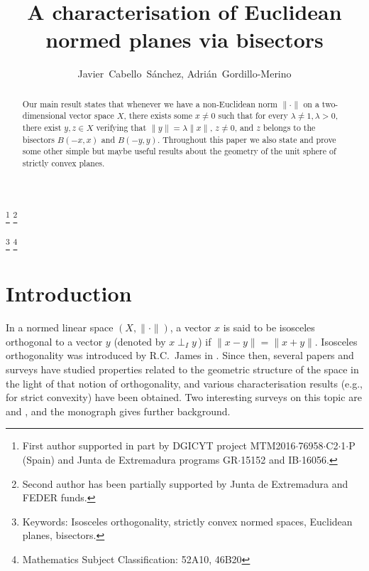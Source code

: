 \documentclass[12pt]{amsproc}
\title{A characterisation of Euclidean normed planes via bisectors}
\theoremstyle{remark}
\def\norma{\|\cdot\|}
\begin{document}
\author
{Javier~Cabello~Sánchez, Adri\'an~Gordillo-Merino}
\address{Departamento de Matem\'{a}ticas, Universidad de Extremadura, Avda. de Elvas s/n, 06006 Badajoz. Spain}
\thanks{First author supported in part by DGICYT project MTM2016$\cdot$76958$\cdot$C2$\cdot$1$\cdot$P (Spain) and Junta de Extremadura programs GR$\cdot$15152 and  IB$\cdot$16056.} 
\thanks{Second author has been partially supported by Junta de Extremadura and FEDER funds.}

\thanks{Keywords: Isosceles orthogonality, strictly convex normed spaces, Euclidean pla\-nes, bisectors.}
\thanks{Mathematics Subject Classification: 52A10, 46B20}

\begin{abstract}
Our main result states that whenever we have a non-Euclidean norm
$\norma$ on a two-dimensional vector space $X$, there exists some $x\neq 0$ such that for every $\lambda\neq 1, 
\lambda>0$, there exist $y, z\in X$ verifying that $\|y\|=\lambda\|x\|$, $z\neq 0$, and $z$ belongs to the bisectors
$B(-x,x)$ and $B(-y,y)$. Throughout this paper we also state and prove some other
simple but maybe useful results about the geometry of the unit sphere of strictly convex planes.
\end{abstract}

\maketitle

\section{Introduction}

\bigskip

In a normed linear space $(X,\norma)$, a vector $x$ is said to be isosceles orthogonal to 
a vector $y$ (denoted by $x\perp_I y\,$) if $\|x-y\|=\|x+y\|$. Isosceles orthogonality was 
introduced by R.C.~James in \cite{james1945}. Since then, several papers and surveys have 
studied properties related to the geometric structure of the space in the light of that 
notion of orthogonality, and various characterisation results (e.g., for strict convexity) 
have been obtained. Two interesting surveys on this topic are \cite{alonso2012birkhoff} and \cite{MARTINI200493}, and the monograph \cite{thomson1996} gives further background.

\medskip
\end{document}
